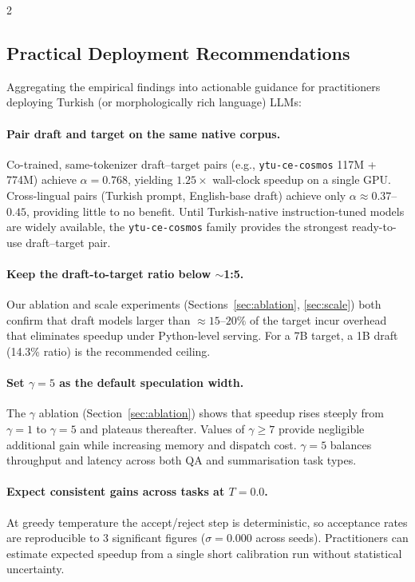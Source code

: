 \documentclass[11pt,a4paper]{article}
\begin{document}
\begin{multicols}{2}
\subsection{Practical Deployment Recommendations}
\label{sec:disc-deployment}

Aggregating the empirical findings into actionable guidance for
practitioners deploying Turkish (or morphologically rich language) LLMs:

\paragraph{Pair draft and target on the same native corpus.}
Co-trained, same-tokenizer draft--target pairs (e.g., \texttt{ytu-ce-cosmos}
117M + 774M) achieve $\alpha=0.768$, yielding $1.25\!\times$ wall-clock
speedup on a single GPU.
Cross-lingual pairs (Turkish prompt, English-base draft) achieve only
$\alpha\approx0.37$--$0.45$, providing little to no benefit.
Until Turkish-native instruction-tuned models are widely available,
the \texttt{ytu-ce-cosmos} family provides the strongest ready-to-use
draft--target pair.

\paragraph{Keep the draft-to-target ratio below $\sim$1:5.}
Our ablation and scale experiments (Sections~\ref{sec:ablation},
\ref{sec:scale}) both confirm that draft models larger than
$\approx\!15$--$20\%$ of the target incur overhead that eliminates
speedup under Python-level serving.
For a 7B target, a 1B draft (14.3\% ratio) is the recommended ceiling.

\paragraph{Set $\gamma = 5$ as the default speculation width.}
The $\gamma$ ablation (Section~\ref{sec:ablation}) shows that speedup
rises steeply from $\gamma=1$ to $\gamma=5$ and plateaus thereafter.
Values of $\gamma\geq7$ provide negligible additional gain while
increasing memory and dispatch cost.
$\gamma=5$ balances throughput and latency across both QA and
summarisation task types.

\paragraph{Expect consistent gains across tasks at $T=0.0$.}
At greedy temperature the accept/reject step is deterministic, so
acceptance rates are reproducible to 3 significant figures ($\sigma=0.000$
across seeds).
Practitioners can estimate expected speedup from a single short
calibration run without statistical uncertainty.


\end{multicols}
\end{document}
